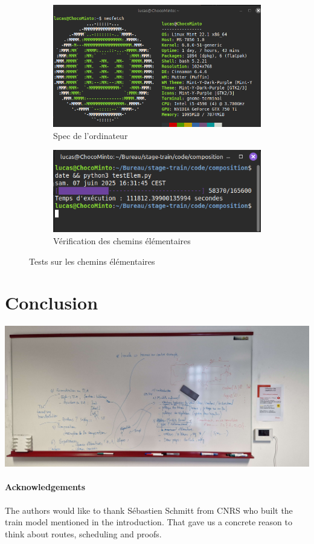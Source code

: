 \documentclass[runningheads]{llncs}
\begin{document}
\begin{figure}
	\begin{subfigure}{0.5\textwidth}
		\centering
		\includegraphics[width=\textwidth]{img/spec_pc.png}
		\caption{Spec de l'ordinateur}
	\end{subfigure}
	\begin{subfigure}{0.5\textwidth}
		\centering
		\includegraphics[width=\textwidth+0.5cm]{img/testElem.png}
		\caption{Vérification des chemins élémentaires}
	\end{subfigure}
	\caption{Tests sur les chemins élémentaires}
\end{figure}
\label{fig:elem-tests}

\section{Conclusion}
\label{sec:conclusion}

\includegraphics[scale=0.1]{img/sommaire_tableau.jpg}

\paragraph{Acknowledgements} The authors would like to thank Sébastien Schmitt from CNRS who built the train model mentioned in the introduction. That gave us a concrete reason to think about routes, scheduling and proofs. 



\end{document}
